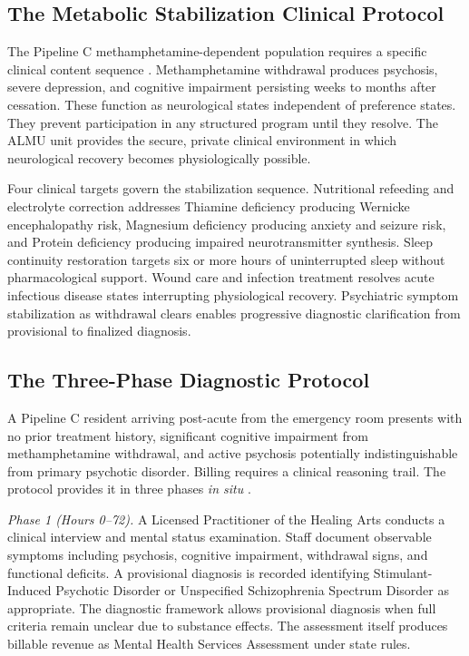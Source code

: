 \documentclass[12pt, letterpaper]{article}
\begin{document}
\subsection{The Metabolic Stabilization Clinical Protocol}

The Pipeline C methamphetamine-dependent population requires a specific clinical content sequence \citep{refeeding_syndrome_2008}. Methamphetamine withdrawal produces psychosis, severe depression, and cognitive impairment persisting weeks to months after cessation. These function as neurological states independent of preference states. They prevent participation in any structured program until they resolve. The ALMU unit provides the secure, private clinical environment in which neurological recovery becomes physiologically possible.

Four clinical targets govern the stabilization sequence. Nutritional refeeding and electrolyte correction addresses Thiamine deficiency producing Wernicke encephalopathy risk, Magnesium deficiency producing anxiety and seizure risk, and Protein deficiency producing impaired neurotransmitter synthesis. Sleep continuity restoration targets six or more hours of uninterrupted sleep without pharmacological support. Wound care and infection treatment resolves acute infectious disease states interrupting physiological recovery. Psychiatric symptom stabilization as withdrawal clears enables progressive diagnostic clarification from provisional to finalized diagnosis.

\subsection{The Three-Phase Diagnostic Protocol}

A Pipeline C resident arriving post-acute from the emergency room presents with no prior treatment history, significant cognitive impairment from methamphetamine withdrawal, and active psychosis potentially indistinguishable from primary psychotic disorder. Billing requires a clinical reasoning trail. The protocol provides it in three phases \textit{in situ} \citep{dhcs_mhrc_2024}.

\textit{Phase 1 (Hours 0--72).} A Licensed Practitioner of the Healing Arts conducts a clinical interview and mental status examination. Staff document observable symptoms including psychosis, cognitive impairment, withdrawal signs, and functional deficits. A provisional diagnosis is recorded identifying Stimulant-Induced Psychotic Disorder or Unspecified Schizophrenia Spectrum Disorder as appropriate. The diagnostic framework allows provisional diagnosis when full criteria remain unclear due to substance effects. The assessment itself produces billable revenue as Mental Health Services Assessment under state rules.
\end{document}
